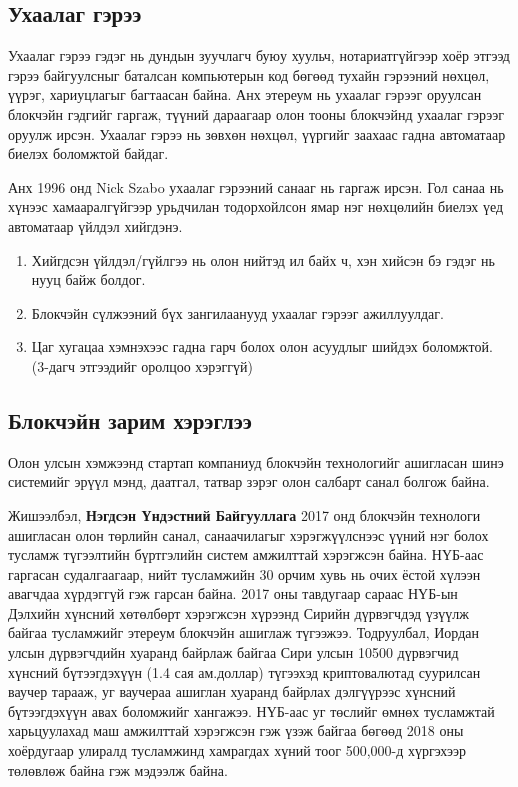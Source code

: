 \subsection{Ухаалаг гэрээ}
Ухаалаг гэрээ гэдэг нь дундын зуучлагч буюу хуульч, нотариатгүйгээр хоёр этгээд гэрээ байгуулсныг баталсан компьютерын код бөгөөд тухайн гэрээний нөхцөл, үүрэг, хариуцлагыг багтаасан байна. Анх этереум нь ухаалаг гэрээг оруулсан блокчэйн гэдгийг гаргаж, түүний дараагаар олон тооны блокчэйнд ухаалаг гэрээг оруулж ирсэн. Ухаалаг гэрээ нь зөвхөн нөхцөл, үүргийг заахаас гадна автоматаар биелэх боломжтой байдаг.

Анх 1996 онд Nick Szabo  ухаалаг гэрээний санааг нь гаргаж ирсэн. Гол санаа нь хүнээс хамааралгүйгээр урьдчилан тодорхойлсон ямар нэг нөхцөлийн биелэх үед автоматаар үйлдэл хийгдэнэ.

\begin{enumerate}
   \item  Хийгдсэн үйлдэл/гүйлгээ нь олон нийтэд ил байх ч, хэн хийсэн бэ гэдэг нь нууц байж болдог.
   \item  Блокчэйн сүлжээний бүх зангилаанууд ухаалаг гэрээг ажиллуулдаг.
   \item Цаг хугацаа хэмнэхээс гадна гарч болох олон асуудлыг шийдэх боломжтой. (3-дагч этгээдийг оролцоо хэрэггүй)
\end{enumerate}

\subsection{Блокчэйн зарим хэрэглээ}
Олон улсын хэмжээнд стартап компаниуд блокчэйн технологийг ашигласан шинэ системийг эрүүл мэнд, даатгал, татвар зэрэг олон салбарт санал болгож байна.

Жишээлбэл, \textbf{Нэгдсэн Үндэстний Байгууллага} 2017 онд блокчэйн технологи
ашигласан олон төрлийн санал, санаачилагыг хэрэгжүүлснээс үүний нэг болох тусламж түгээлтийн бүртгэлийн систем амжилттай хэрэгжсэн байна. НҮБ-аас гаргасан судалгаагаар, нийт тусламжийн 30 орчим хувь нь очих ёстой хүлээн авагчдаа хүрдэггүй гэж гарсан байна. 2017 оны тавдугаар сараас НҮБ-ын Дэлхийн хүнсний хөтөлбөрт хэрэгжсэн хүрээнд Сирийн дүрвэгчдэд үзүүлж байгаа тусламжийг этереум блокчэйн ашиглаж түгээжээ. Тодруулбал, Иордан улсын дүрвэгчдийн хуаранд байрлаж байгаа Сири улсын 10500 дүрвэгчид хүнсний бүтээгдэхүүн (1.4 сая ам.доллар) түгээхэд криптовалютад суурилсан ваучер тарааж, уг ваучераа ашиглан хуаранд байрлах дэлгүүрээс хүнсний бүтээгдэхүүн авах боломжийг хангажээ. НҮБ-аас уг төслийг өмнөх тусламжтай харьцуулахад маш амжилттай хэрэгжсэн гэж үзэж байгаа бөгөөд 2018 оны хоёрдугаар улиралд тусламжинд хамрагдах хүний тоог 500,000-д хүргэхээр төлөвлөж байна гэж мэдээлж байна.

